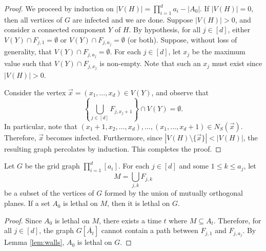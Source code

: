 \begin{proof}
We proceed by induction on $|V(H)| = \prod_{i=1}^d a_i - |A_0|$. If $|V(H)| = 0$, then all vertices of $G$ are infected and we are done. Suppose $|V(H)| > 0$, and consider a connected component $Y$ of $H$. By hypothesis, for all $j \in [d]$, either $V(Y) \cap F_{j,1} = \emptyset$ or $V(Y) \cap F_{j,a_j} = \emptyset$ (or both). Suppose, without loss of generality, that $V(Y) \cap F_{j,a_j} = \emptyset$.
For each $j \in [d]$, let $x_j$ be the maximum value such that $V(Y) \cap F_{j,x_j}$ is non-empty. Note that such an $x_j$ must exist since $|V(H)| > 0$. 

Consider the vertex $\vec{x} = (x_1, \dots, x_d) \in V(Y)$, and observe that 
$$\left\{\bigcup_{j \in [d]} F_{j,x_j+1}\right\} \cap  V(Y) = \emptyset.$$
In particular, note that $(x_1+1, x_2, \dots, x_d), \dots, (x_1, \dots, x_d+1) \in N_S(\vec{x})$. Therefore, $\vec{x}$ becomes infected. Furthermore, since $|V(H) \setminus \{\vec{x}\}| < |V(H)|$, the resulting graph percolates by induction. This completes the proof.
\end{proof}

\begin{cor}
\label{cor:walls}
Let $G$ be the grid graph $\prod_{i=1}^d [a_i]$. For each $j \in [d]$ and some $1 \leq k \leq a_j$, let 
$$M = \bigcup_{j,k} F_{j,k}$$
be a subset of the vertices of $G$ formed by the union of mutually orthogonal planes. If a set $A_0$ is lethal on $M$, then it is lethal on $G$. 
\end{cor}

\begin{proof}
Since $A_0$ is lethal on $M$, there exists a time $t$ where $M \subseteq A_t$. Therefore, for all $j \in [d]$, the graph $G[\overline{A_t}]$ cannot contain a path between $F_{j,1}$ and $F_{j,a_j}$. By Lemma \ref{lem:walls}, $A_0$ is lethal on $G$. 
\end{proof}

